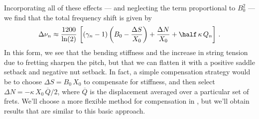 Incorporating all of these effects --- and neglecting the term proportional to $B_0^2$ --- we find that the total frequency shift is given by
 \begin{equation}\label{eqn:error_tot}
\Delta \nu_n \approx \frac{1200}{\ln(2)}\, \left[ \left(\gamma_n - 1\right) \left(B_0 - \frac{\Delta S}{X_0}\right) + \frac{\Delta N}{X_0} + \half\, \kappa\, Q_n \right]\, .
 \end{equation}
In this form, we see that the bending stiffness and the increase in string tension due to fretting sharpen the pitch, but that we can flatten it with a positive saddle setback and negative nut setback. In fact, a simple compensation strategy would be to choose $\Delta S = B_0\, X_0$ to compensate for stiffness, and then select $\Delta N = - \kappa\, X_0\, \overline{Q} / 2$, where $\overline{Q}$ is the displacement averaged over a particular set of frets. We'll choose a more flexible method for compensation in , but we'll obtain results that are similar to this basic approach. 